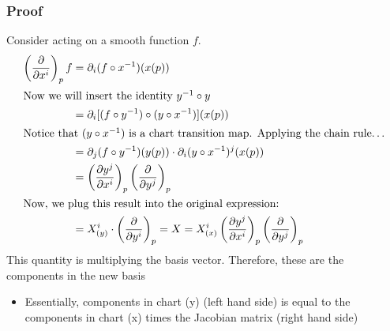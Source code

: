 \documentclass[10pt]{article}
\begin{document}
\subsubsection*{Proof}
Consider acting on a smooth function $f$.
\begin{align*}
    \left(\frac{\partial}{\partial x^i}\right)_p f &= \partial_i (f \circ x^{-1})(x(p))\\
    \intertext{Now we will insert the identity $y^{-1}\circ y$}
    &= \partial_i[(f \circ y^{-1}) \circ (y \circ x^{-1})] (x(p))\\
    \intertext{Notice that $(y \circ x^{-1})$ is a chart transition map.  Applying the chain rule\dots}
    &= \partial_j (f \circ y^{-1})(y(p)) \cdot \partial_i (y \circ x^{-1})^j (x(p))\\
    &= \left(\frac{\partial y^j}{\partial x^i}\right)_p \left(\frac{\partial}{\partial y^j}\right)_p\\
    \intertext{Now, we plug this result into the original expression:}
    &= X_{(y)}^i \cdot \left(\frac{\partial}{\partial y^i}\right)_p = X = X_{(x)}^i \left(\frac{\partial y^j}{\partial x^i}\right)_p \left( \frac{\partial}{\partial y^j}\right)_p
\end{align*}
This quantity is multiplying the basis vector.  Therefore, these are the components in the new basis
\begin{itemize}
    \item Essentially, components in chart (y) (left hand side) is equal to the components in chart (x) times the Jacobian matrix (right hand side)
\end{itemize}
\end{document}
